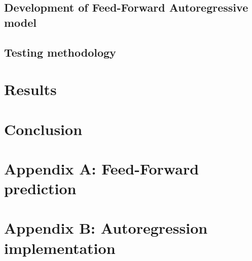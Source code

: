 \documentclass[journal]{IEEEtranTIE}
\begin{document}
\subsection{Development of Feed-Forward Autoregressive model} \label{sec:feed}

\subsection{Testing methodology}

\section{Results} \label{sec:results}

\section{Conclusion} \label{sec:conclussion}





%
%
{
\clearpage
\appendices
\section{Appendix A: Feed-Forward prediction}  \label{app:Feed-Forward}

\clearpage
\section{Appendix B: Autoregression implementation}  \label{app:AutoFeedback}

}
{}
\end{document}
